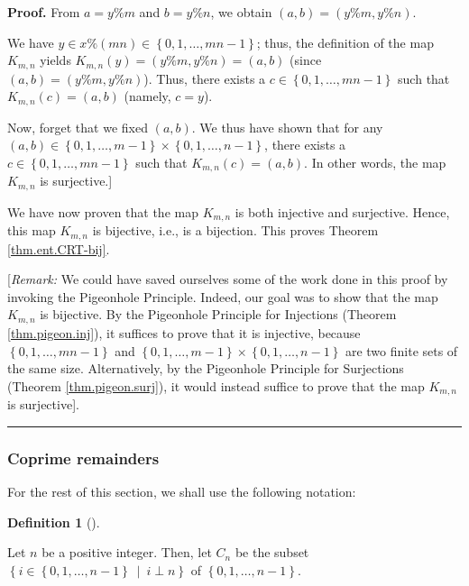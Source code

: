 \documentclass[numbers=enddot,12pt,final,onecolumn,notitlepage]{scrartcl}%
\numberwithin{exer}{subsection}
\theoremstyle{definition}
\newtheorem{defi}[theo]{Definition}
\newenvironment{definition}[1][]
{\begin{defi}[#1]\begin{leftbar}}
{\end{leftbar}\end{defi}}
\newenvironment{proof}[1][Proof]{\noindent\textbf{#1.} }{\ \rule{0.5em}{0.5em}}
\begin{document}
\begin{proof}
From $a=y\%m$ and $b=y\%n$, we obtain $\left(  a,b\right)  =\left(
y\%m,y\%n\right)  $.

We have $y\in x\%\left(  mn\right)  \in\left\{  0,1,\ldots,mn-1\right\}  $;
thus, the definition of the map $K_{m,n}$ yields $K_{m,n}\left(  y\right)
=\left(  y\%m,y\%n\right)  =\left(  a,b\right)  $ (since $\left(  a,b\right)
=\left(  y\%m,y\%n\right)  $). Thus, there exists a $c\in\left\{
0,1,\ldots,mn-1\right\}  $ such that $K_{m,n}\left(  c\right)  =\left(
a,b\right)  $ (namely, $c=y$).

Now, forget that we fixed $\left(  a,b\right)  $. We thus have shown that for
any $\left(  a,b\right)  \in\left\{  0,1,\ldots,m-1\right\}  \times\left\{
0,1,\ldots,n-1\right\}  $, there exists a $c\in\left\{  0,1,\ldots
,mn-1\right\}  $ such that $K_{m,n}\left(  c\right)  =\left(  a,b\right)  $.
In other words, the map $K_{m,n}$ is surjective.]

We have now proven that the map $K_{m,n}$ is both injective and surjective.
Hence, this map $K_{m,n}$ is bijective, i.e., is a bijection. This proves
Theorem \ref{thm.ent.CRT-bij}.

[\textit{Remark:} We could have saved ourselves some of the work done in this
proof by invoking the Pigeonhole Principle. Indeed, our goal was to show that
the map $K_{m,n}$ is bijective. By the Pigeonhole Principle for Injections
(Theorem \ref{thm.pigeon.inj}), it suffices to prove that it is injective,
because $\left\{  0,1,\ldots,mn-1\right\}  $ and $\left\{  0,1,\ldots
,m-1\right\}  \times\left\{  0,1,\ldots,n-1\right\}  $ are two finite sets of
the same size. Alternatively, by the Pigeonhole Principle for Surjections
(Theorem \ref{thm.pigeon.surj}), it would instead suffice to prove that the
map $K_{m,n}$ is surjective].
\end{proof}

\subsubsection{Coprime remainders}

For the rest of this section, we shall use the following notation:

\begin{definition}
\label{def.ent.CRT-bij.Cn}Let $n$ be a positive integer. Then, let $C_{n}$ be
the subset $\left\{  i\in\left\{  0,1,\ldots,n-1\right\}  \ \mid\ i\perp
n\right\}  $ of $\left\{  0,1,\ldots,n-1\right\}  $.
\end{definition}
\end{document}

